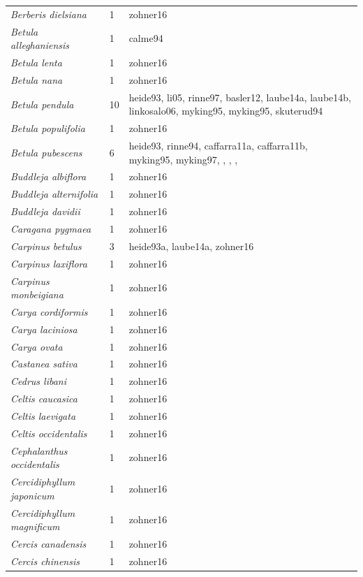 \documentclass{article}
\begin{document}
\begin{footnotesize}
\begin{longtable}{p{}p{}p{}}
  \textit{Berberis dielsiana} &   1 & zohner16 \\ 
  \textit{Betula alleghaniensis} &   1 & calme94 \\ 
  \textit{Betula lenta} &   1 & zohner16 \\ 
  \textit{Betula nana} &   1 & zohner16 \\ 
  \textit{Betula pendula} &  10 & heide93, li05, rinne97, basler12, laube14a, laube14b, linkosalo06, myking95, myking95, skuterud94 \\ 
  \textit{Betula populifolia} &   1 & zohner16 \\ 
  \textit{Betula pubescens} &   6 & heide93, rinne94, caffarra11a, caffarra11b, myking95, myking97, , , ,  \\ 
  \textit{Buddleja albiflora} &   1 & zohner16 \\ 
  \textit{Buddleja alternifolia} &   1 & zohner16 \\ 
  \textit{Buddleja davidii} &   1 & zohner16 \\ 
  \textit{Caragana pygmaea} &   1 & zohner16 \\ 
  \textit{Carpinus betulus} &   3 & heide93a, laube14a, zohner16 \\ 
  \textit{Carpinus laxiflora} &   1 & zohner16 \\ 
  \textit{Carpinus monbeigiana} &   1 & zohner16 \\ 
  \textit{Carya cordiformis} &   1 & zohner16 \\ 
  \textit{Carya laciniosa} &   1 & zohner16 \\ 
  \textit{Carya ovata} &   1 & zohner16 \\ 
  \textit{Castanea sativa} &   1 & zohner16 \\ 
  \textit{Cedrus libani} &   1 & zohner16 \\ 
  \textit{Celtis caucasica} &   1 & zohner16 \\ 
  \textit{Celtis laevigata} &   1 & zohner16 \\ 
  \textit{Celtis occidentalis} &   1 & zohner16 \\ 
  \textit{Cephalanthus occidentalis} &   1 & zohner16 \\ 
  \textit{Cercidiphyllum japonicum} &   1 & zohner16 \\ 
  \textit{Cercidiphyllum magnificum} &   1 & zohner16 \\ 
  \textit{Cercis canadensis} &   1 & zohner16 \\ 
  \textit{Cercis chinensis} &   1 & zohner16 \\ 

\end{longtable}
\end{footnotesize}
\end{document}
